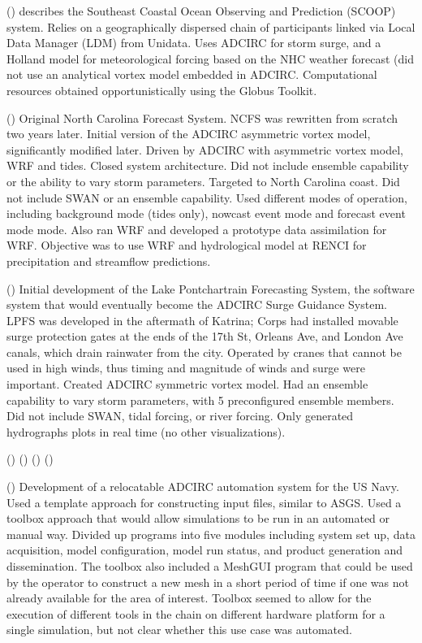 \documentclass[12pt]{article}
\begin{document}
(\cite{RamakrishnanL2006}) describes the Southeast Coastal Ocean 
Observing and Prediction (SCOOP) system. Relies on a geographically 
dispersed chain of participants linked via Local Data Manager (LDM) 
from Unidata. Uses ADCIRC for storm surge, and a Holland model for 
meteorological forcing based on the NHC weather forecast (did not 
use an analytical vortex model embedded in ADCIRC. Computational 
resources obtained opportunistically using the Globus Toolkit. 

(\cite{MattocksC2006}) Original North Carolina Forecast System. NCFS 
was rewritten from scratch two years later. Initial version of the 
ADCIRC asymmetric vortex model, significantly modified later. Driven 
by ADCIRC with asymmetric vortex model, WRF and tides. Closed system 
architecture.  Did not include ensemble capability or the ability to 
vary storm parameters. Targeted to North Carolina coast. Did not 
include SWAN or an ensemble capability. Used different modes of 
operation, including background mode (tides only), nowcast event 
mode and forecast event mode mode. Also ran WRF and developed a 
prototype data assimilation for WRF. Objective was to use WRF and 
hydrological model at RENCI for precipitation and streamflow 
predictions.

(\cite{FlemingJG2008}) Initial development of the Lake Pontchartrain 
Forecasting System, the software system that would eventually become 
the ADCIRC Surge Guidance System. LPFS was developed in the 
aftermath of Katrina; Corps had installed movable surge protection 
gates at the ends of the 17th St, Orleans Ave, and London Ave 
canals, which drain rainwater from the city. Operated by cranes that 
cannot be used in high winds, thus timing and magnitude of winds and 
surge were important. Created ADCIRC symmetric vortex model. Had an 
ensemble capability to vary storm parameters, with 5 preconfigured 
ensemble members. Did not include SWAN, tidal forcing, or river 
forcing. Only generated hydrographs plots in real time (no other 
visualizations).

(\cite {BlainCA1998}) (\cite{BlainCA2002}) (\cite{BlainCA2002}) (\cite {BlainCA2002Tidal})

(\cite{ChuP2009}) Development of a relocatable ADCIRC automation 
system for the US Navy. Used a template approach for constructing 
input files, similar to ASGS. Used a toolbox approach that would 
allow simulations to be run in an automated or manual way. Divided 
up programs into five modules including system set up, data 
acquisition, model configuration, model run status, and product 
generation and dissemination. The toolbox also included a MeshGUI 
program that could be used by the operator to construct a new mesh 
in a short period of time if one was not already available for the 
area of interest. Toolbox seemed to allow for the execution of 
different tools in the chain on different hardware platform for a 
single simulation, but not clear whether this use case was automated. 
\end{document}
